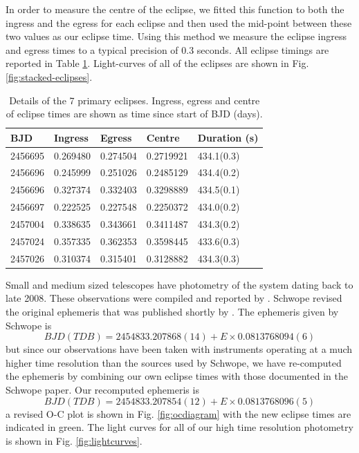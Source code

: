 \documentclass[a4paper,fleqn,usenatbib]{mnras}
\begin{document}
In order to measure the centre of the eclipse, we fitted this function to both the ingress and the egress for each eclipse and then used the mid-point between these two values as our eclipse time. Using this method we measure the eclipse ingress and egress times to a typical precision of 0.3 seconds. All eclipse timings are reported in Table \ref{tab:eclipses}. Light-curves of all of the eclipses are shown in Fig. \ref{fig:stacked-eclipses}. 

\begin{table}
  \caption{Details of the 7 primary eclipses. Ingress, egress and centre of eclipse times are shown as time since start of BJD (days).}
  \begin{tabular}{ l  l  l  l  l  }
  \hline
 	BJD & Ingress & Egress & Centre & Duration (s) \\
  \hline
    2456695 & 0.269480 & 0.274504 & 0.2719921 & 434.1(0.3) \\
    2456696 & 0.245999 & 0.251026 & 0.2485129 & 434.4(0.2) \\
    2456696 & 0.327374 & 0.332403 & 0.3298889 & 434.5(0.1) \\
    2456697 & 0.222525 & 0.227548 & 0.2250372 & 434.0(0.2) \\
    2457004 & 0.338635 & 0.343661 & 0.3411487 & 434.3(0.2) \\
    2457024 & 0.357335 & 0.362353 & 0.3598445 & 433.6(0.3) \\
    2457026 & 0.310374 & 0.315401 & 0.3128882 & 434.3(0.3) \\
  \hline
  \end{tabular}
  \label{tab:eclipses}
\end{table}

Small and medium sized telescopes have photometry of the system dating back to late 2008. These observations were compiled and reported by \citet{Schwope2015}. Schwope revised the original ephemeris that was published shortly by  \citet{Thorne2010}. The ephemeris given by Schwope is 
\begin{equation}BJD(TDB) = 2454833.207868(14) + E\times0.0813768094(6)\end{equation}
but since our observations have been taken with instruments operating at a much higher time resolution than the sources used by Schwope, we have re-computed the ephemeris by combining our own eclipse times with those documented in the Schwope paper. Our recomputed ephemeris is 
\begin{equation}BJD(TDB) = 2454833.207854(12) + E\times0.0813768096(5)\label{eq:ephemeris}\end{equation}
a revised O-C plot is shown in Fig. \ref{fig:ocdiagram} with the new eclipse times are indicated in green. The light curves for all of our high time resolution photometry is shown in Fig. \ref{fig:lightcurves}.
\end{document}
